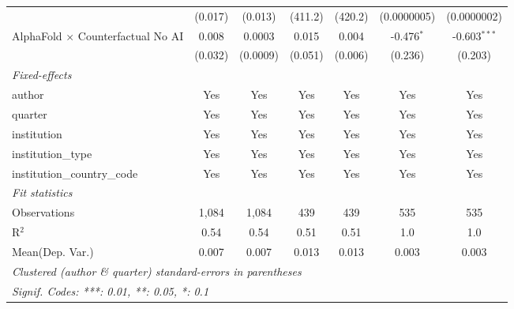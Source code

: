 \begin{tabular}{lcccccc}
                                            & (0.017) & (0.013)  & (411.2) & (420.2) & (0.0000005)     & (0.0000002)\\   
   AlphaFold $\times$ Counterfactual No AI  & 0.008   & 0.0003   & 0.015   & 0.004   & -0.476$^{*}$    & -0.603$^{***}$\\   
                                            & (0.032) & (0.0009) & (0.051) & (0.006) & (0.236)         & (0.203)\\   
   \midrule
   \emph{Fixed-effects}\\
   author                                   & Yes     & Yes      & Yes     & Yes     & Yes             & Yes\\  
   quarter                                  & Yes     & Yes      & Yes     & Yes     & Yes             & Yes\\  
   institution                              & Yes     & Yes      & Yes     & Yes     & Yes             & Yes\\  
   institution\_type                        & Yes     & Yes      & Yes     & Yes     & Yes             & Yes\\  
   institution\_country\_code               & Yes     & Yes      & Yes     & Yes     & Yes             & Yes\\  
   \midrule
   \emph{Fit statistics}\\
   Observations                             & 1,084   & 1,084    & 439     & 439     & 535             & 535\\  
   R$^2$                                    & 0.54    & 0.54     & 0.51    & 0.51    & 1.0             & 1.0\\  
Mean(Dep. Var.) & 0.007 & 0.007 & 0.013 & 0.013 & 0.003 & 0.003 \\
   \midrule \midrule
   \multicolumn{7}{l}{\emph{Clustered (author \& quarter) standard-errors in parentheses}}\\
   \multicolumn{7}{l}{\emph{Signif. Codes: ***: 0.01, **: 0.05, *: 0.1}}\\
\end{tabular}
\par\endgroup
